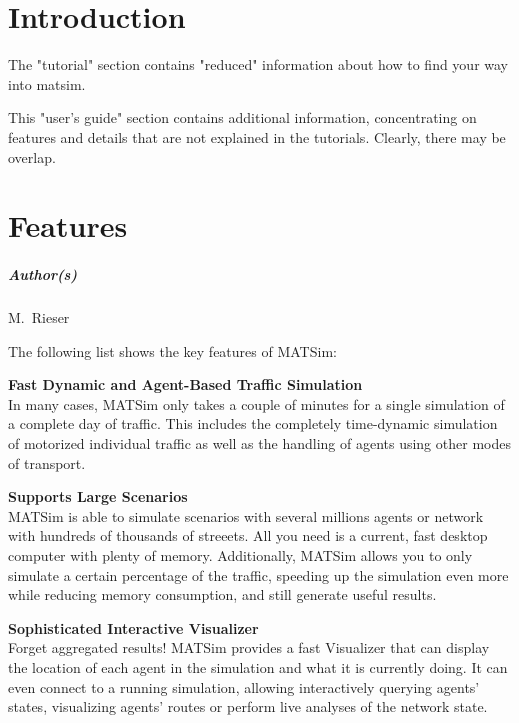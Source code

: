 \chapter{Introduction}

The "tutorial" section contains "reduced" information about how to find your way into matsim.

This "user's guide" section contains additional information,  concentrating on features and details that are not explained in the  tutorials. Clearly, there may be overlap.

\chapter{Features}

\paragraph{Author(s)}

M.\ Rieser

\bigskip

The following list shows the key features of MATSim:

\textbf{Fast Dynamic and Agent-Based Traffic Simulation}
\\  In many cases, MATSim only takes a couple of minutes for a single  simulation of a complete day of traffic. This includes the completely  time-dynamic simulation of motorized individual traffic as well as the  handling of agents using other modes of transport.

\textbf{Supports Large Scenarios}
\\  MATSim is able to simulate scenarios with several millions agents or  network with hundreds of thousands of streeets. All you need is a  current, fast desktop computer with plenty of memory. Additionally,  MATSim allows you to only simulate a certain percentage of the traffic,  speeding up the simulation even more while reducing memory consumption,  and still generate useful results.

\textbf{Sophisticated Interactive Visualizer}
\\  Forget aggregated results! MATSim provides a fast Visualizer that can  display the location of each agent in the simulation and what it is  currently doing. It can even connect to a running simulation, allowing  interactively querying agents' states, visualizing agents' routes or  perform live analyses of the network state.

